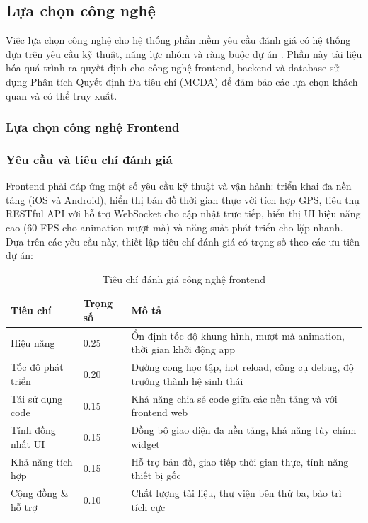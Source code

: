 \subsection{Lựa chọn công nghệ}

Việc lựa chọn công nghệ cho hệ thống phần mềm yêu cầu đánh giá có hệ thống dựa trên yêu cầu kỹ thuật, năng lực nhóm và ràng buộc dự án \cite{bass2021}. Phần này tài liệu hóa quá trình ra quyết định cho công nghệ frontend, backend và database sử dụng Phân tích Quyết định Đa tiêu chí (MCDA) để đảm bảo các lựa chọn khách quan và có thể truy xuất.

\subsubsection{Lựa chọn công nghệ Frontend}

\subsubsection*{Yêu cầu và tiêu chí đánh giá}

Frontend phải đáp ứng một số yêu cầu kỹ thuật và vận hành: triển khai đa nền tảng (iOS và Android), hiển thị bản đồ thời gian thực với tích hợp GPS, tiêu thụ RESTful API với hỗ trợ WebSocket cho cập nhật trực tiếp, hiển thị UI hiệu năng cao (60 FPS cho animation mượt mà) và năng suất phát triển cho lặp nhanh. Dựa trên các yêu cầu này, thiết lập tiêu chí đánh giá có trọng số theo các ưu tiên dự án:

\begin{table}[h]
\centering
\caption{Tiêu chí đánh giá công nghệ frontend}
\begin{tabular}{|p{3.5cm}|p{2cm}|p{8cm}|}
\hline
\textbf{Tiêu chí} & \textbf{Trọng số} & \textbf{Mô tả} \\
\hline
Hiệu năng & 0.25 & Ổn định tốc độ khung hình, mượt mà animation, thời gian khởi động app \\
\hline
Tốc độ phát triển & 0.20 & Đường cong học tập, hot reload, công cụ debug, độ trưởng thành hệ sinh thái \\
\hline
Tái sử dụng code & 0.15 & Khả năng chia sẻ code giữa các nền tảng và với frontend web \\
\hline
Tính đồng nhất UI & 0.15 & Đồng bộ giao diện đa nền tảng, khả năng tùy chỉnh widget \\
\hline
Khả năng tích hợp & 0.15 & Hỗ trợ bản đồ, giao tiếp thời gian thực, tính năng thiết bị gốc \\
\hline
Cộng đồng \& hỗ trợ & 0.10 & Chất lượng tài liệu, thư viện bên thứ ba, bảo trì tích cực \\
\hline
\end{tabular}
\end{table}

